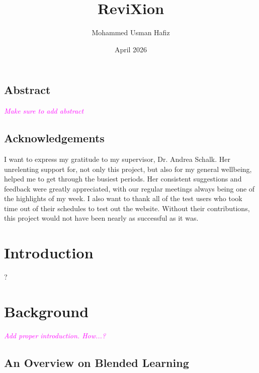 \documentclass{report}
\title{ReviXion}
\author{Mohammed Usman Hafiz}
\date{April 2026}
\begin{document}
\maketitle

\newpage
\thispagestyle{empty}

\vspace*{4cm}

\begin{center}
    \section*{Abstract}
\end{center}
\textcolor{magenta}{\textit{Make sure to add abstract}}

\vfill

\newpage
\thispagestyle{empty}

\vspace*{4cm}

\begin{center}
    \section*{Acknowledgements}
\end{center}
I want to express my gratitude to my supervisor, Dr. Andrea Schalk.
Her unrelenting support for, not only this project, but also for my general wellbeing, helped me to get through the busiest periods.
Her consistent suggestions and feedback were greatly appreciated, with our regular meetings always being one of the highlights of my week.
I also want to thank all of the test users who took time out of their schedules to test out the website.
Without their contributions, this project would not have been nearly as successful as it was.

\vfill

\tableofcontents

\chapter{Introduction}

?

\chapter{Background}

\textcolor{magenta}{\textit{Add proper introduction. How...?}}

\section{An Overview on Blended Learning}
\end{document}
